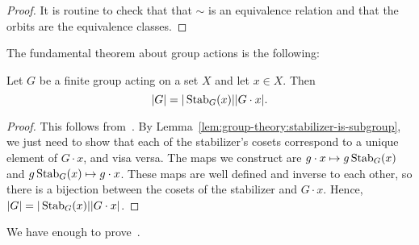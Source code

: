 \begin{proof}
  It is routine to check that that \(\sim\) is an equivalence relation and that the orbits are the equivalence classes.
\end{proof}

The fundamental theorem about group actions is the following:

\begin{theorem}\label{thm:group-theory:orbit-stabilizer}
  Let \(G\) be a finite group acting on a set \(X\) and let \(x \in X\). Then
  \[|G| = |\operatorname{Stab}_{G}(x)| |G \cdot x|.\]
\end{theorem}

\begin{proof}
  This follows from~. By Lemma~\ref{lem:group-theory:stabilizer-is-subgroup}, we just need to show that each of the stabilizer's cosets correspond to a unique element of \(G \cdot x\), and visa versa. The maps we construct are \(g \cdot x \mapsto g\operatorname{Stab}_{G}(x)\) and \(g\operatorname{Stab}_{G}(x) \mapsto g\cdot x\). These maps are well defined and inverse to each other, so there is a bijection between the cosets of the stabilizer and \(G \cdot x\). Hence, \(|G| = |\operatorname{Stab}_{G}(x)| |G \cdot x|\).
\end{proof}

We have enough to prove~.

